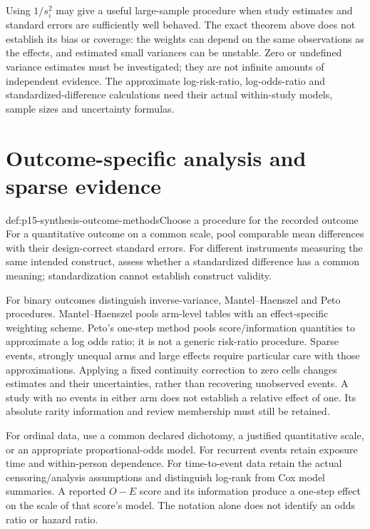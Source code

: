 Using \(1/s_i^2\) may give a useful large-sample procedure when study
estimates and standard errors are sufficiently well behaved. The exact theorem
above does not establish its bias or coverage: the weights can depend on the
same observations as the effects, and estimated small variances can be unstable.
Zero or undefined variance estimates must be investigated; they are not infinite
amounts of independent evidence. The approximate log-risk-ratio, log-odds-ratio
and standardized-difference calculations need their actual within-study
models, sample sizes and uncertainty formulas.

\section{Outcome-specific analysis and sparse evidence}
\label{sec:p15-synthesis-outcomes}

\begin{hbmethod}{def:p15-synthesis-outcome-methods}{Choose a procedure for the recorded outcome}
For a quantitative outcome on a common scale, pool comparable mean differences
with their design-correct standard errors. For different instruments measuring
the same intended construct, assess whether a standardized difference has a
common meaning; standardization cannot establish construct validity.

For binary outcomes distinguish inverse-variance, Mantel--Haenszel and Peto
procedures. Mantel--Haenszel pools arm-level tables with an effect-specific
weighting scheme. Peto's one-step method pools score/information quantities to
approximate a log odds ratio; it is not a generic risk-ratio procedure.
Sparse events, strongly unequal arms and large effects require particular
care with those approximations. Applying a fixed continuity correction to
zero cells changes estimates and their uncertainties, rather than recovering
unobserved events. A study with no events in either arm does not establish a
relative effect of one. Its absolute rarity information and review membership
must still be retained.

For ordinal data, use a common declared dichotomy, a justified quantitative
scale, or an appropriate proportional-odds model. For recurrent events retain
exposure time and within-person dependence. For time-to-event data retain the
actual censoring/analysis assumptions and distinguish log-rank from Cox
model summaries. A reported \(O-E\) score and its information produce a
one-step effect on the scale of that score's model. The notation alone does
not identify an odds ratio or hazard ratio.
\end{hbmethod}

